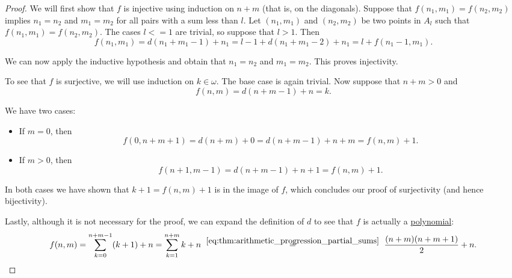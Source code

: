 \begin{proof}
  We will first show that \( f \) is injective using induction on \( n + m \) (that is, on the diagonals). Suppose that \( f(n_1, m_1) = f(n_2, m_2) \) implies \( n_1 = n_2 \) and \( m_1 = m_2 \) for all pairs with a sum less than \( l \). Let \( (n_1, m_1) \) and \( (n_2, m_2) \) be two points in \( A_l \) such that \( f(n_1, m_1) = f(n_2, m_2) \). The cases \( l <= 1 \) are trivial, so suppose that \( l > 1 \). Then
  \begin{equation*}
    f(n_1, m_1)
    =
    d(n_1 + m_1 - 1) + n_1
    =
    l - 1 + d(n_1 + m_1 - 2) + n_1
    =
    l + f(n_1 - 1, m_1).
  \end{equation*}

  We can now apply the inductive hypothesis and obtain that \( n_1 = n_2 \) and \( m_1 = m_2 \). This proves injectivity.

  To see that \( f \) is surjective, we will use induction on \( k \in \omega \). The base case is again trivial. Now suppose that \( n + m > 0 \) and
  \begin{equation*}
    f(n, m) = d(n + m - 1) + n = k.
  \end{equation*}

  We have two cases:
  \begin{itemize}
    \item If \( m = 0 \), then
    \begin{equation*}
      f(0, n + m + 1) = d(n + m) + 0 = d(n + m - 1) + n + m = f(n, m) + 1.
    \end{equation*}

    \item If \( m > 0 \), then
    \begin{equation*}
      f(n + 1, m - 1) = d(n + m - 1) + n + 1 = f(n, m) + 1.
    \end{equation*}
  \end{itemize}

  In both cases we have shown that \( k + 1 = f(n, m) + 1 \) is in the image of \( f \), which concludes our proof of surjectivity (and hence bijectivity).

  Lastly, although it is not necessary for the proof, we can expand the definition of \( d \) to see that \( f \) is actually a \hyperref[def:polynomial_algebra]{polynomial}:
  \begin{equation*}
    f(n, m)
    =
    \sum_{k=0}^{n + m - 1} (k + 1) + n
    =
    \sum_{k=1}^{n + m} k + n
    \reloset {\eqref{eq:thm:arithmetic_progression_partial_sums}} =
    \frac {(n + m) (n + m + 1)} 2 + n.
  \end{equation*}


\end{proof}
